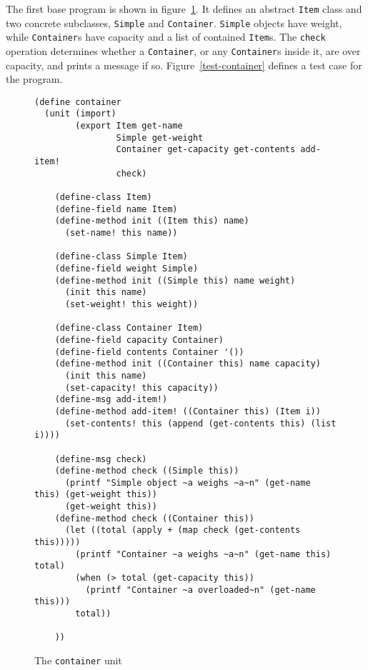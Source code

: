 \documentclass{article}
\newcommand{\code}[1]{\texttt{#1}}
\begin{document}
The first base program is shown in figure~\ref{container}.  It defines
an abstract \code{Item} class and two concrete subclasses,
\code{Simple} and \code{Container}.  \code{Simple} objects have
weight, while \code{Container}s have capacity and a list of contained
\code{Item}s.  The \code{check} operation determines whether a
\code{Container}, or any \code{Container}s inside it, are over
capacity, and prints a message if so.  Figure~\ref{test-container}
defines a test case for the program.

\begin{figure}
\caption{The \code{container} unit}
\label{container}
\begin{verbatim}
(define container
  (unit (import)
        (export Item get-name
                Simple get-weight
                Container get-capacity get-contents add-item!
                check)
        
    (define-class Item)
    (define-field name Item)
    (define-method init ((Item this) name)
      (set-name! this name))

    (define-class Simple Item)
    (define-field weight Simple)
    (define-method init ((Simple this) name weight)
      (init this name)
      (set-weight! this weight))

    (define-class Container Item)
    (define-field capacity Container)
    (define-field contents Container '())
    (define-method init ((Container this) name capacity)
      (init this name)
      (set-capacity! this capacity))
    (define-msg add-item!)
    (define-method add-item! ((Container this) (Item i))
      (set-contents! this (append (get-contents this) (list i))))

    (define-msg check)
    (define-method check ((Simple this))
      (printf "Simple object ~a weighs ~a~n" (get-name this) (get-weight this))
      (get-weight this))
    (define-method check ((Container this))
      (let ((total (apply + (map check (get-contents this)))))
        (printf "Container ~a weighs ~a~n" (get-name this) total)
        (when (> total (get-capacity this))
          (printf "Container ~a overloaded~n" (get-name this)))
        total))

    ))
\end{verbatim}
\end{figure}
\end{document}
